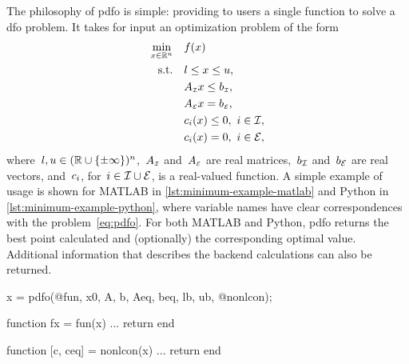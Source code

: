 The philosophy of \gls{pdfo} is simple: providing to users a single function to solve a \gls{dfo} problem.
It takes for input an optimization problem of the form
\begin{subequations}
    \label{eq:pdfo}
    \begin{align}
        \min_{\iter \in \R^n}   & \quad \obj(\iter)\\
        \text{s.t.}             & \quad \xl \le \iter \le \xu, \label{eq:pdfo-bds}\\
                                & \quad A_{\scriptscriptstyle\iub} \iter \le b_{\scriptscriptstyle\iub}, \label{eq:pdfo-lub}\\
                                & \quad A_{\scriptscriptstyle\ieq} \iter = b_{\scriptscriptstyle\ieq}, \label{eq:pdfo-leq}\\
                                & \quad \con{i}(\iter) \le 0, ~ i \in \iub, \label{eq:pdfo-nlub}\\
                                & \quad \con{i}(\iter) = 0, ~ i \in \ieq, \label{eq:pdfo-nleq}
    \end{align}
\end{subequations}
where~$l, u \in (\mathbb{R} \cup \{\pm \infty\})^n$,~$A_{\scriptscriptstyle\mathcal{I}}$ and~$A_{\scriptscriptstyle\mathcal{E}}$ are real matrices,~$b _{\mathcal{I}}$ and~$b _{\mathcal{E}}$ are real vectors, and~$c_{i}$, for~$i \in \mathcal{I} \cup \mathcal{E}$, is a real-valued function.
A simple example of usage is shown for MATLAB in \cref{lst:minimum-example-matlab} and Python in \cref{lst:minimum-example-python}, where variable names have clear correspondences with the problem~\cref{eq:pdfo}.
For both MATLAB and Python, \gls{pdfo} returns the best point calculated and (optionally) the corresponding optimal value.
Additional information that describes the backend calculations can also be returned.

\begin{lstmatlab}[%
    caption=An elementary example of using \gls{pdfo} in MATLAB,
    label=lst:minimum-example-matlab,
]
    x = pdfo(@fun, x0, A, b, Aeq, beq, lb, ub, @nonlcon);

    function fx = fun(x)
    ...
    return
    end

    function [c, ceq] = nonlcon(x)
    ...
    return
    end
\end{lstmatlab}

